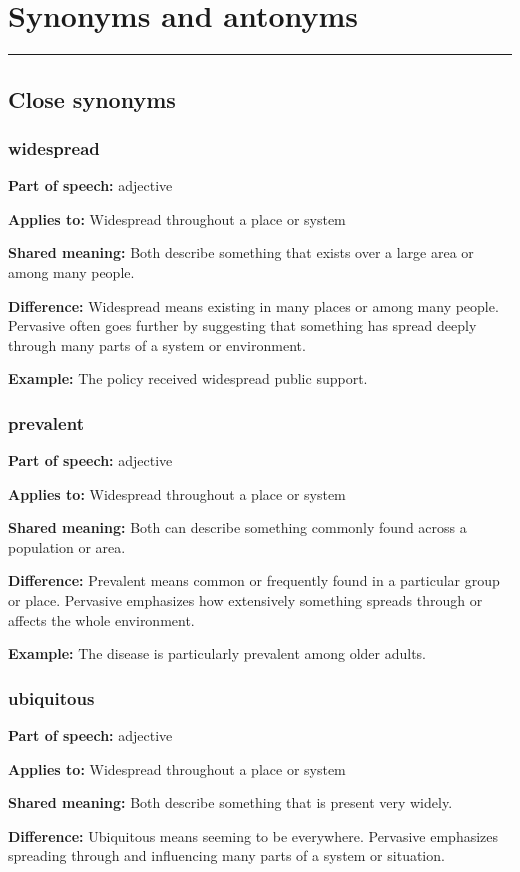 \documentclass[11pt]{article}
\newcommand{\sectionrule}{\par\vspace{-0.5em}\noindent\textcolor{Accent}{\rule{\linewidth}{0.6pt}}\par}
\begin{document}
\section{Synonyms and antonyms}
\sectionrule
\subsection{Close synonyms}
\subsubsection{widespread}
\textbf{Part of speech:} adjective

\textbf{Applies to:} Widespread throughout a place or system

\textbf{Shared meaning:} Both describe something that exists over a large area or among many people.

\textbf{Difference:} Widespread means existing in many places or among many people. Pervasive often goes further by suggesting that something has spread deeply through many parts of a system or environment.

\textbf{Example:} The policy received widespread public support.

\subsubsection{prevalent}
\textbf{Part of speech:} adjective

\textbf{Applies to:} Widespread throughout a place or system

\textbf{Shared meaning:} Both can describe something commonly found across a population or area.

\textbf{Difference:} Prevalent means common or frequently found in a particular group or place. Pervasive emphasizes how extensively something spreads through or affects the whole environment.

\textbf{Example:} The disease is particularly prevalent among older adults.

\subsubsection{ubiquitous}
\textbf{Part of speech:} adjective

\textbf{Applies to:} Widespread throughout a place or system

\textbf{Shared meaning:} Both describe something that is present very widely.

\textbf{Difference:} Ubiquitous means seeming to be everywhere. Pervasive emphasizes spreading through and influencing many parts of a system or situation.
\end{document}
